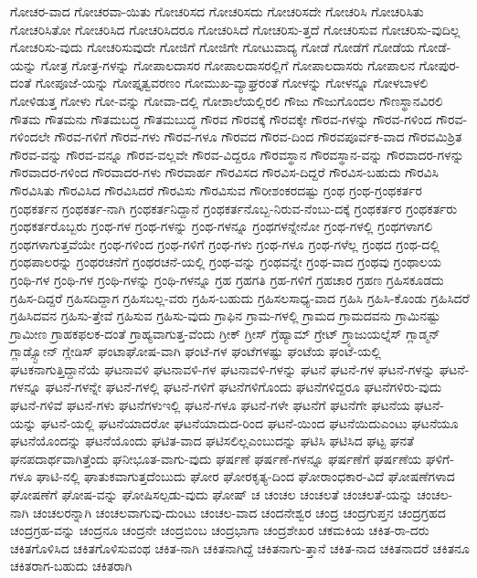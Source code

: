 {ಗೋಚರ-ವಾದ
ಗೋಚರವಾ-ಯಿತು
ಗೋಚರಿಸದ
ಗೋಚರಿಸದು
ಗೋಚರಿಸದೇ
ಗೋಚರಿಸಿ
ಗೋಚರಿಸಿತು
ಗೋಚರಿಸಿತೋ
ಗೋಚರಿಸಿದ
ಗೋಚರಿಸಿದರೂ
ಗೋಚರಿಸಿದೆ
ಗೋಚರಿಸು-ತ್ತದೆ
ಗೋಚರಿಸುವ
ಗೋಚರಿಸು-ವುದಿಲ್ಲ
ಗೋಚರಿಸು-ವುದು
ಗೋಚರಿಸುವುದೇ
ಗೋಜಿಗೆ
ಗೋಜಿಗೇ
ಗೋಟುವಾದ್ಯ
ಗೋಡೆ
ಗೋಡೆಗೆ
ಗೋಡೆಯ
ಗೋಡೆ-ಯನ್ನು
ಗೋತ್ರ
ಗೋತ್ರ-ಗಳನ್ನು
ಗೋಪಾಲದಾಸರ
ಗೋಪಾಲದಾಸರಲ್ಲಿಗೆ
ಗೋಪಾಲದಾಸರು
ಗೋಪಾಲನ
ಗೋಪುರ-ದಂತೆ
ಗೋಪೂಜೆ-ಯನ್ನು
ಗೋಪ್ತೃತ್ವವರಣಂ
ಗೋಮುಖ-ವ್ಯಾಘ್ರರಂತೆ
ಗೋಳನ್ನು
ಗೋಳನ್ನೂ
ಗೋಳಬಾಳಲಿ
ಗೋಳಿಡುತ್ತ
ಗೋಳು
ಗೋ-ವನ್ನು
ಗೋವಾ-ದಲ್ಲಿ
ಗೋಶಾಲೆಯಲ್ಲಿರಲಿ
ಗೌಜು
ಗೌಜುಗೊಂದಲ
ಗೌಣಸ್ಥಾನವಿರಲಿ
ಗೌತಮ
ಗೌತಮನು
ಗೌತಮಬದ್ಧ
ಗೌತಮಬುದ್ಧ
ಗೌರವ
ಗೌರವಕ್ಕೆ
ಗೌರವಕ್ಕೇ
ಗೌರವ-ಗಳನ್ನು
ಗೌರವ-ಗಳಿಂದ
ಗೌರವ-ಗಳಿಂದಲೇ
ಗೌರವ-ಗಳಿಗೆ
ಗೌರವ-ಗಳು
ಗೌರವ-ಗಳೂ
ಗೌರವದ
ಗೌರವ-ದಿಂದ
ಗೌರವಪೂರ್ವಕ-ವಾದ
ಗೌರವಮಿಶ್ರಿತ
ಗೌರವ-ವನ್ನು
ಗೌರವ-ವನ್ನೂ
ಗೌರವ-ವಲ್ಲವೇ
ಗೌರವ-ವಿದ್ದರೂ
ಗೌರವಸ್ಥಾನ
ಗೌರವಸ್ಥಾನ-ವನ್ನು
ಗೌರವಾದರ-ಗಳನ್ನು
ಗೌರವಾದರ-ಗಳಿಂದ
ಗೌರವಾದರ-ಗಳು
ಗೌರವಾರ್ಹ
ಗೌರವಿಸದ
ಗೌರವಿಸ-ದಿದ್ದರೆ
ಗೌರವಿಸ-ಬಹುದು
ಗೌರವಿಸಿ
ಗೌರವಿಸಿತು
ಗೌರವಿಸಿದ
ಗೌರವಿಸಿದರೆ
ಗೌರವಿಸು
ಗೌರವಿಸುವ
ಗೌರೀಶಂಕರದಷ್ಟು
ಗ್ರಂಥ
ಗ್ರಂಥ-ಗ್ರಂಥಕರ್ತರ
ಗ್ರಂಥಕರ್ತನ
ಗ್ರಂಥಕರ್ತ-ನಾಗಿ
ಗ್ರಂಥಕರ್ತನಿದ್ದಾನೆ
ಗ್ರಂಥಕರ್ತನೊಬ್ಬ-ನಿರುವ-ನೆಂಬು-ದಕ್ಕೆ
ಗ್ರಂಥಕರ್ತರ
ಗ್ರಂಥಕರ್ತರು
ಗ್ರಂಥಕರ್ತರೊಬ್ಬರು
ಗ್ರಂಥ-ಗಳ
ಗ್ರಂಥ-ಗಳನ್ನು
ಗ್ರಂಥ-ಗಳನ್ನೂ
ಗ್ರಂಥಗಳನ್ನೇನೋ
ಗ್ರಂಥ-ಗಳಲ್ಲಿ
ಗ್ರಂಥಗಳಾಗಲಿ
ಗ್ರಂಥಗಳಾಗುತ್ತವೆಯೇ
ಗ್ರಂಥ-ಗಳಿಂದ
ಗ್ರಂಥ-ಗಳಿಗೆ
ಗ್ರಂಥ-ಗಳು
ಗ್ರಂಥ-ಗಳೂ
ಗ್ರಂಥ-ಗಳೆಲ್ಲ
ಗ್ರಂಥದ
ಗ್ರಂಥ-ದಲ್ಲಿ
ಗ್ರಂಥಪಾಲರನ್ನು
ಗ್ರಂಥರಚನೆಗೆ
ಗ್ರಂಥರಚನೆ-ಯಲ್ಲಿ
ಗ್ರಂಥ-ವನ್ನು
ಗ್ರಂಥವನ್ನೇ
ಗ್ರಂಥ-ವಾದ
ಗ್ರಂಥವು
ಗ್ರಂಥಾಲಯ
ಗ್ರಂಥಿ-ಗಳ
ಗ್ರಂಥಿ-ಗಳ
ಗ್ರಂಥಿ-ಗಳನ್ನು
ಗ್ರಂಥಿ-ಗಳನ್ನೂ
ಗ್ರಹ
ಗ್ರಹಗತಿ
ಗ್ರಹ-ಗಳಿಗೆ
ಗ್ರಹಚಾರ
ಗ್ರಹಣ
ಗ್ರಹಿಸಕೂಡದು
ಗ್ರಹಿಸ-ದಿದ್ದರೆ
ಗ್ರಹಿಸದಿದ್ದಾಗ
ಗ್ರಹಿಸಬಲ್ಲ-ವರು
ಗ್ರಹಿಸ-ಬಹುದು
ಗ್ರಹಿಸಲಸಾಧ್ಯ-ವಾದ
ಗ್ರಹಿಸಿ
ಗ್ರಹಿಸಿ-ಕೊಂಡು
ಗ್ರಹಿಸಿದರೆ
ಗ್ರಹಿಸಿದವನ
ಗ್ರಹಿಸು-ತ್ತೇವೆ
ಗ್ರಹಿಸುವ
ಗ್ರಹಿಸು-ವುದು
ಗ್ರಾಫಿನ
ಗ್ರಾಮ-ಗಳಲ್ಲಿ
ಗ್ರಾಮದ
ಗ್ರಾಮದವನು
ಗ್ರಾಮಿನಷ್ಟು
ಗ್ರಾಮೀಣ
ಗ್ರಾಹಕಫಲಕ-ದಂತೆ
ಗ್ರಾಹ್ಯವಾಗುತ್ತ-ವೆಂದು
ಗ್ರೀಕ್
ಗ್ರೀಸ್
ಗ್ರೆಹ್ಯಾಮ್
ಗ್ರೇಟ್
ಗ್ರ್ಯಾಜುಯಲ್ನೆಸ್
ಗ್ಲಾಡ್ಮನ್
ಗ್ಲಾಡ್ಸ್ಟೋನ್
ಗ್ಲೇಡಿಸ್
ಘಂಟಾಘೋಷ-ವಾಗಿ
ಘಂಟೆ-ಗಳ
ಘಂಟೆಗಳಷ್ಟು
ಘಂಟೆಯ
ಘಂಟೆ-ಯಲ್ಲಿ
ಘಟಕನಾಗುತ್ತಿದ್ದಾನೆಯೆ
ಘಟನಾವಳಿ
ಘಟನಾವಳಿ-ಗಳ
ಘಟನಾವಳಿ-ಗಳನ್ನು
ಘಟನೆ
ಘಟನೆ-ಗಳ
ಘಟನೆ-ಗಳನ್ನು
ಘಟನೆ-ಗಳನ್ನೂ
ಘಟನೆ-ಗಳನ್ನೇ
ಘಟನೆ-ಗಳಲ್ಲಿ
ಘಟನೆ-ಗಳಿಗೆ
ಘಟನೆಗಳಿಗೊಂದು
ಘಟನೆಗಳಿದ್ದರೂ
ಘಟನೆಗಳಿರು-ವುದು
ಘಟನೆ-ಗಳಿವೆ
ಘಟನೆ-ಗಳು
ಘಟನೆಗಳುಇಲ್ಲಿ
ಘಟನೆ-ಗಳೂ
ಘಟನೆ-ಗಳೇ
ಘಟನೆಗೆ
ಘಟನೆಗೇ
ಘಟನೆಯ
ಘಟನೆ-ಯನ್ನು
ಘಟನೆ-ಯಲ್ಲಿ
ಘಟನೆಯಾದರೋ
ಘಟನೆಯಾದುದ-ರಿಂದ
ಘಟನೆ-ಯಿಂದ
ಘಟನೆಯಿದುಎಂಟು
ಘಟನೆಯೂ
ಘಟನೆಯೊಂದನ್ನು
ಘಟನೆಯೊಂದು
ಘಟಿತ-ವಾದ
ಘಟಿಸಲಿಲ್ಲಎಂಬುದನ್ನು
ಘಟಿಸಿ
ಘಟಿಸಿದ
ಘಟ್ಟ
ಘನತೆ
ಘನಪದಾರ್ಥವಾಗಿತ್ತೆಂದು
ಘನೀಭೂತ-ವಾಗು-ವುದು
ಘರ್ಷಣೆ
ಘರ್ಷಣೆ-ಗಳನ್ನೂ
ಘರ್ಷಣೆಗೆ
ಘರ್ಷಣೆಯ
ಘಳಿಗೆ-ಗಳೂ
ಘಾಟಿ-ನಲ್ಲಿ
ಘಾತುಕವಾಗುತ್ತದೆಂಬುದು
ಘೋರ
ಘೋರಕೃತ್ಯ-ದಿಂದ
ಘೋರಾಂಧಕಾರ-ವಿದೆ
ಘೋಷಣೆಗಳಾದ
ಘೋಷಣೆಗೆ
ಘೋಷ-ವನ್ನು
ಘೋಷಿಸಲ್ಪಡು-ವುದು
ಘೋಷ್
ಚ
ಚಂಚಲ
ಚಂಚಲತೆ
ಚಂಚಲತೆ-ಯನ್ನು
ಚಂಚಲ-ನಾಗಿ
ಚಂಚಲರನ್ನಾಗಿ
ಚಂಚಲವಾಗುವು-ದುಂಟು
ಚಂಚಲ-ವಾದ
ಚಂದನೇಶ್ವರ
ಚಂದ್ರ
ಚಂದ್ರಗುಪ್ತನ
ಚಂದ್ರಗ್ರಹದ
ಚಂದ್ರಗ್ರಹ-ವನ್ನು
ಚಂದ್ರನೂ
ಚಂದ್ರನೇ
ಚಂದ್ರಬಿಂಬ
ಚಂದ್ರಭಾಗಾ
ಚಂದ್ರಶೇಖರ
ಚಕಮಕಿಯ
ಚಕಿತ-ರಾ-ದರು
ಚಕಿತಗೊಳಿಸಿದ
ಚಕಿತಗೊಳಿಸುವಂಥ
ಚಕಿತ-ನಾಗಿ
ಚಕಿತನಾಗಿದ್ದೆ
ಚಕಿತನಾಗು-ತ್ತಾನೆ
ಚಕಿತ-ನಾದ
ಚಕಿತನಾದರೆ
ಚಕಿತನೂ
ಚಕಿತರಾಗ-ಬಹುದು
ಚಕಿತರಾಗಿ
}
